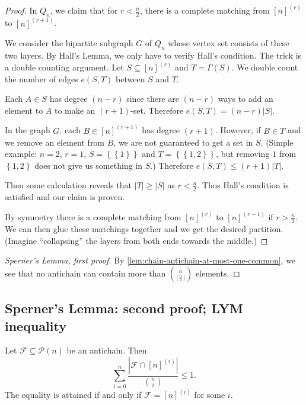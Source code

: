 \begin{proof}
  In $Q_n$, we claim that for $r < \frac{n}{2}$, there is a complete matching from $[n]^{(r)}$ to $[n]^{(r+1)}$.
  
  We consider the bipartite subgraph $G$ of $Q_n$ whose vertex set consists of these two layers. By Hall's Lemma, we only have to verify Hall's condition. The trick is a double counting argument. Let $S \subseteq [n]^{(r)}$ and $T = \Gamma(S)$. We double count the number of edges $e(S, T)$ between $S$ and $T$. 

  Each $A \in S$ has degree $(n-r)$ since there are $(n-r)$ ways to add an element to $A$ to make an $(r+1)$-set. Therefore $e(S, T) = (n-r) |S|$. 
  
  In the graph $G$, each  $B \in [n]^{(r+1)}$ has degree $(r+1)$. However, if $B \in T$ and we remove an element from $B$, we are not guaranteed to get a set in $S$. (Simple example: $n = 2$, $r=1$,   $S = \left\{ \left\{ 1 \right\}  \right\} $ and $T = \left\{ \left\{ 1,2 \right\}  \right\} $, but removing $1$ from $\left\{ 1,2 \right\} $ does not give us something in $S$.) Therefore $e(S, T) \le (r+1) |T|$. 
  
  Then some calculation reveals that $|T| \ge |S|$ as $r < \frac{n}{2}$. Thus Hall's condition is satisfied and our claim is proven. 
  
  By symmetry there is a complete matching from $[n]^{(r)}$ to $[n]^{(r-1)}$ if $r >\frac{n}{2}$. We can then glue these matchings together and we get the desired partition. (Imagine ``collapsing'' the layers from both ends towards the middle.)  
\end{proof}


\begin{proof}[Sperner's Lemma, first proof]
  By \cref{lem:chain-antichain-at-most-one-common}, we see that no antichain can contain more than $\binom{n}{\lfloor \frac{n}{2} \rfloor}$ elements.
\end{proof}

\subsection{Sperner's Lemma: second proof; LYM inequality}


\begin{theorem}
  Let $\mathcal{F} \subseteq  \mathcal{P}(n)$ be an antichain. Then $$
  \sum_{i = 0}^{n} \frac{|\mathcal{F} \cap [n]^{(i)}|}{\binom{n}{i}} \le 1
  .$$ 
  The equality is attained if and only if $\mathcal{F} = [n]^{(i)}$ for some $i$. 
\end{theorem}


